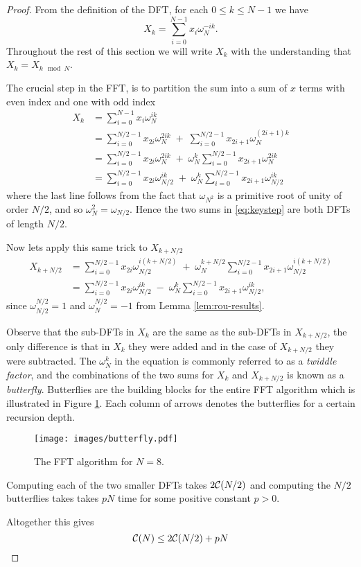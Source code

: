 \begin{proof}
    From the definition of the DFT, for each $0 \le k \le N-1$ we have
    \[
        X_k = \sum^{N-1}_{i=0}x_i\omega_N^{-ik}.
    \]
    Throughout the rest of this section we will write $X_k$ with the understanding that $X_{k} = X_{k \mod N}$.

    The crucial step in the FFT, is to partition the sum into a sum of $x$ terms with even index and one with odd index
    \begin{align}
        X_k
    &= \sum^{N-1}_{i=0}x_i\omega_N^{ik} \nonumber\\
    &= \sum^{N/2-1}_{i=0}x_{2i}\omega_N^{2ik} \;+\; \sum^{N/2-1}_{i=0}x_{2i+1} \omega_N^{(2i+1)k} \nonumber\\
    &= \sum^{N/2-1}_{i=0}x_{2i}\omega_N^{2ik} \;+\; \omega_N^k \sum^{N/2-1}_{i=0}x_{2i+1}\omega_N^{2ik}\\
    &= \sum^{N/2-1}_{i=0}x_{2i}\omega_{N/2}^{ik} \;+\; \omega_N^k \sum^{N/2-1}_{i=0}x_{2i+1}\omega_{N/2}^{ik} \label{eq:keystep}
    \end{align}
    where the last line follows from the fact that $\omega_{N^2}$ is a primitive root of unity of order $N/2$, and so $\omega_N^2 = \omega_{N/2}$. Hence the two sums in \eqref{eq:keystep} are both DFTs of length $N/2$. 

    Now lets apply this same trick to $X_{k + N/2}$
    \begin{align*}
        X_{k + N/2}
    &= \sum^{N/2-1}_{i=0}x_{2i}\omega_{N/2}^{i(k + N/2)} \;+\; \omega_N^{k+ N/2} \sum^{N/2-1}_{i=0}x_{2i+1}\omega_{N/2}^{i(k + N/2)}\\
    &= \sum^{N/2-1}_{i=0}x_{2i}\omega_{N/2}^{ik} \;-\; \omega_N^k \sum^{N/2-1}_{i=0}x_{2i+1}\omega_{N/2}^{ik},
    \end{align*}
    since $\omega_{N/2}^{N/2} = 1$ and $\omega_N^{N/2} = -1$ from Lemma \eqref{lem:rou-results}.

    Observe that the sub-DFTs in $X_k$ are the same as the sub-DFTs in $X_{k + N/2}$, the only difference is that in $X_k$ they were added and in the case of $X_{k + N/2}$ they were subtracted. The $\omega_N^k$ in the equation is commonly referred to as a \textit{twiddle factor}, and the combinations of the two sums for $X_k$ and $X_{k + N/2}$ is known as a \textit{butterfly}. Butterflies are the building blocks for the entire FFT algorithm which is illustrated in Figure \ref{fig:butterflies}. Each column of arrows denotes the butterflies for a certain recursion depth.
    
    \begin{figure}[t]
        \texttt{[image: images/butterfly.pdf]}
        \caption{The FFT algorithm for $N = 8$.}
        \label{fig:butterflies}
        \centering
    \end{figure}

    Computing each of the two smaller DFTs takes $2\mathcal C(N/2)$ and computing the $N/2$ butterflies takes takes $pN$ time for some positive constant $p > 0$.

    Altogether this gives
    \[
        \mathcal C(N) \le 2 \mathcal C(N/2) + pN
    \]
\end{proof}


